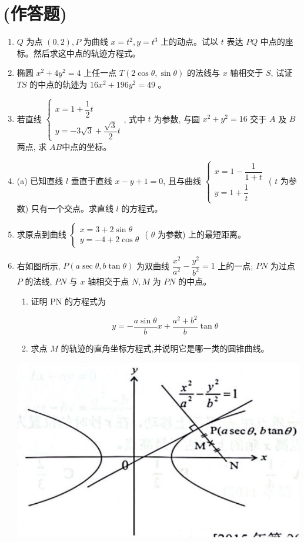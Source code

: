 \documentclass[10pt]{article}
\begin{document}
\section*{(作答题)}
\begin{enumerate}
  \item $Q$ 为点 $(0,2), P$ 为曲线 $x=t^{2}, y=t^{3}$ 上的动点。试以 $t$ 表达 $PQ$ 中点的座标。然后求这中点的轨迹方程式。
  \item 椭圆 $x^{2}+4 y^{2}=4$ 上任一点 $T(2 \cos \theta, \sin \theta)$ 的法线与 $x$ 轴相交于 $S$, 试证 $TS$ 的中点的轨迹为 $16 x^{2}+196 y^{2}=49$ 。
  \item 若直线 $\left\{\begin{array}{l}x=1+\dfrac{1}{2} t \\ y=-3 \sqrt{3}+\dfrac{\sqrt{3}}{2} t\end{array}\right.$, 式中 $t$ 为参数, 与圆 $x^{2}+y^{2}=16$ 交于 $A$ 及 $B$ 两点, 求 $AB$中点的坐标。
  \item (a) 已知直线 $l$ 垂直于直线 $x-y+1=0$, 且与曲线 $\left\{\begin{array}{l}x=1-\dfrac{1}{1+t} \\ y=1+\dfrac{1}{t}\end{array}\right.$ ( $t$ 为参数) 只有一个交点。求直线 $l$ 的方程式。
  \item 求原点到曲线 $\left\{\begin{array}{l}x=3+2 \sin \theta \\ y=-4+2 \cos \theta\end{array}\right.$ ( $\theta$ 为参数) 上的最短距离。
  \item 右如图所示, $P(a \sec \theta, b \tan \theta)$ 为双曲线 $\dfrac{x^{2}}{a^{2}}-\dfrac{y^{2}}{b^{2}}=1$ 上的一点; $PN$ 为过点 $P$ 的法线, $PN$ 与 $x$ 轴相交于点 $N, M$ 为 $PN$ 的中点。

\begin{enumerate}
  \item 证明 PN 的方程式为

  $$
  y=-\dfrac{a \sin \theta}{b} x+\dfrac{a^{2}+b^{2}}{b} \tan \theta
  $$
  
  \item 求点 $M$ 的轨迹的直角坐标方程式,并说明它是哪一类的圆锥曲线。
\end{enumerate}

\begin{center}
\includegraphics[max width=\textwidth]{2024_06_05_971e6815482d5ecd2718g-10}
\end{center}


\end{enumerate}
\end{document}
